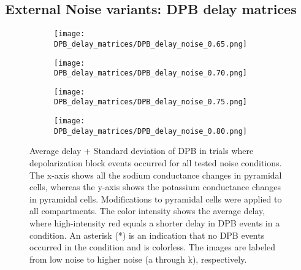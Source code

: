 \subsection{External Noise variants: DPB delay matrices}\label{subsec:DPB_delay_matrices}
\begin{figure}[H]
    \centering
    \begin{subfigure}{0.48\textwidth}
        \texttt{[image: DPB\_delay\_matrices/DPB\_delay\_noise\_0.65.png]}
        \caption{} %
    \end{subfigure}\hfill
    \begin{subfigure}{0.48\textwidth}
        \texttt{[image: DPB\_delay\_matrices/DPB\_delay\_noise\_0.70.png]}
        \caption{} %
    \end{subfigure}

    \bigskip %

    \begin{subfigure}{0.48\textwidth}
        \texttt{[image: DPB\_delay\_matrices/DPB\_delay\_noise\_0.75.png]}
        \caption{} %
    \end{subfigure}\hfill
    \begin{subfigure}{0.48\textwidth}
        \texttt{[image: DPB\_delay\_matrices/DPB\_delay\_noise\_0.80.png]}
        \caption{} %
    \end{subfigure}

    \caption[DPB delay matrices (all)]{Average delay + Standard deviation of DPB in trials where depolarization block events occurred for all tested noise conditions.
        The x-axis shows all the sodium conductance changes in pyramidal cells, whereas the y-axis shows the potassium conductance changes in pyramidal cells.
        Modifications to pyramidal cells were applied to all compartments.
        The color intensity shows the average delay, where high-intensity red equals a shorter delay in DPB events in a condition.
        An asterisk (*) is an indication that no DPB events occurred in the condition and is colorless.
        The images are labeled from low noise to higher noise (a through k), respectively.}\label{fig:dpb_delay_matrices_all}
\end{figure}

